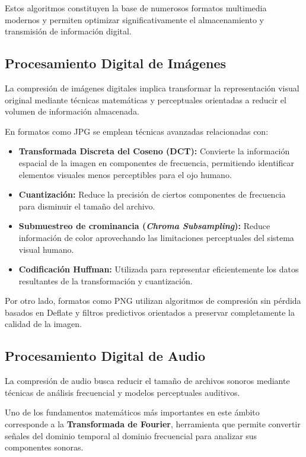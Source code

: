 \documentclass[12pt, oneside, letterpaper]{book}
\begin{document}
Estos algoritmos constituyen la base de numerosos formatos multimedia modernos y permiten optimizar significativamente el almacenamiento y transmisión de información digital.

\subsection{Procesamiento Digital de Imágenes}

La compresión de imágenes digitales implica transformar la representación visual original mediante técnicas matemáticas y perceptuales orientadas a reducir el volumen de información almacenada.

En formatos como JPG se emplean técnicas avanzadas relacionadas con:

\begin{itemize}

\item \textbf{Transformada Discreta del Coseno (DCT):} Convierte la información espacial de la imagen en componentes de frecuencia, permitiendo identificar elementos visuales menos perceptibles para el ojo humano.

\item \textbf{Cuantización:} Reduce la precisión de ciertos componentes de frecuencia para disminuir el tamaño del archivo.

\item \textbf{Submuestreo de crominancia (\textit{Chroma Subsampling}):} Reduce información de color aprovechando las limitaciones perceptuales del sistema visual humano.

\item \textbf{Codificación Huffman:} Utilizada para representar eficientemente los datos resultantes de la transformación y cuantización.
\end{itemize}

Por otro lado, formatos como PNG utilizan algoritmos de compresión sin pérdida basados en Deflate y filtros predictivos orientados a preservar completamente la calidad de la imagen.

\subsection{Procesamiento Digital de Audio}

La compresión de audio busca reducir el tamaño de archivos sonoros mediante técnicas de análisis frecuencial y modelos perceptuales auditivos.

Uno de los fundamentos matemáticos más importantes en este ámbito corresponde a la \textbf{Transformada de Fourier}, herramienta que permite convertir señales del dominio temporal al dominio frecuencial para analizar sus componentes sonoras.
\end{document}
